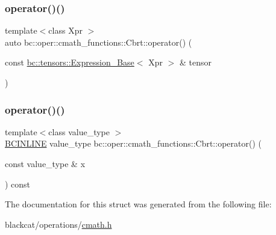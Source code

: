 \mbox{\label{structbc_1_1oper_1_1cmath__functions_1_1Cbrt_a7c1542de49f36c0c3a53ad2fd790073b}} 
\subsubsection{\texorpdfstring{operator()()}{operator()()}\hspace{0.1cm}{\footnotesize\ttfamily [2/3]}}
{\footnotesize\ttfamily template$<$class Xpr $>$ \\
auto bc\+::oper\+::cmath\+\_\+functions\+::\+Cbrt\+::operator() (\begin{DoxyParamCaption}\item[{const \hyperlink{classbc_1_1tensors_1_1Expression__Base}{bc\+::tensors\+::\+Expression\+\_\+\+Base}$<$ Xpr $>$ \&}]{tensor }\end{DoxyParamCaption})\hspace{0.3cm}{\ttfamily [inline]}}

\mbox{\label{structbc_1_1oper_1_1cmath__functions_1_1Cbrt_ac3bc8f628fe41ca465719771da7d1f2d}} 
\subsubsection{\texorpdfstring{operator()()}{operator()()}\hspace{0.1cm}{\footnotesize\ttfamily [3/3]}}
{\footnotesize\ttfamily template$<$class value\+\_\+type $>$ \\
\hyperlink{common_8h_a6699e8b0449da5c0fafb878e59c1d4b1}{B\+C\+I\+N\+L\+I\+NE} value\+\_\+type bc\+::oper\+::cmath\+\_\+functions\+::\+Cbrt\+::operator() (\begin{DoxyParamCaption}\item[{const value\+\_\+type \&}]{x }\end{DoxyParamCaption}) const\hspace{0.3cm}{\ttfamily [inline]}}



The documentation for this struct was generated from the following file\+:\begin{DoxyCompactItemize}
\item 
blackcat/operations/\hyperlink{cmath_8h}{cmath.\+h}\end{DoxyCompactItemize}
